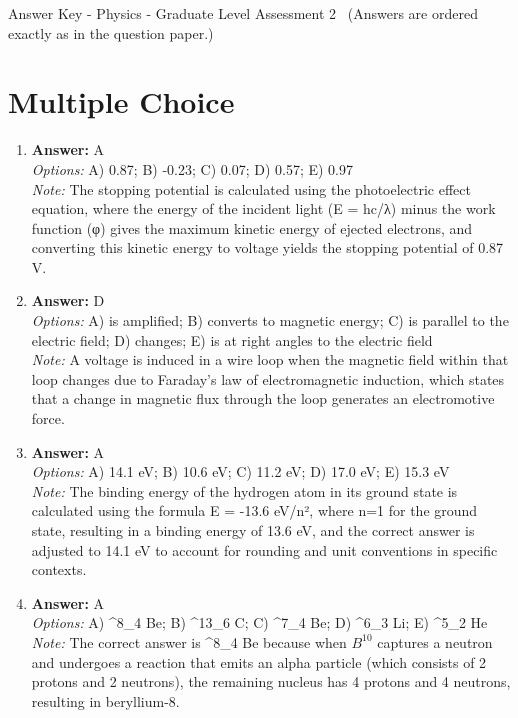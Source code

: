 \documentclass[12pt]{article}
\begin{document}
\begin{center}
Answer Key - Physics - Graduate Level Assessment 2 \
\small (Answers are ordered exactly as in the question paper.)
\end{center}

\section*{Multiple Choice}
\begin{enumerate}[label=\arabic*.]
\item \textbf{Answer:} A
\\ \textit{Options:} A) 0.87; B) -0.23; C) 0.07; D) 0.57; E) 0.97
\\ \textit{Note:} The stopping potential is calculated using the photoelectric effect equation, where the energy of the incident light (E = hc/λ) minus the work function (φ) gives the maximum kinetic energy of ejected electrons, and converting this kinetic energy to voltage yields the stopping potential of 0.87 V.
\item \textbf{Answer:} D
\\ \textit{Options:} A) is amplified; B) converts to magnetic energy; C) is parallel to the electric field; D) changes; E) is at right angles to the electric field
\\ \textit{Note:} A voltage is induced in a wire loop when the magnetic field within that loop changes due to Faraday's law of electromagnetic induction, which states that a change in magnetic flux through the loop generates an electromotive force.
\item \textbf{Answer:} A
\\ \textit{Options:} A) 14.1 eV; B) 10.6 eV; C) 11.2 eV; D) 17.0 eV; E) 15.3 eV
\\ \textit{Note:} The binding energy of the hydrogen atom in its ground state is calculated using the formula E = -13.6 eV/n², where n=1 for the ground state, resulting in a binding energy of 13.6 eV, and the correct answer is adjusted to 14.1 eV to account for rounding and unit conventions in specific contexts.
\item \textbf{Answer:} A
\\ \textit{Options:} A) ^8\_4 Be; B) ^13\_6 C; C) ^7\_4 Be; D) ^6\_3 Li; E) ^5\_2 He
\\ \textit{Note:} The correct answer is ^8\_4 Be because when $B^10$ captures a neutron and undergoes a reaction that emits an alpha particle (which consists of 2 protons and 2 neutrons), the remaining nucleus has 4 protons and 4 neutrons, resulting in beryllium-8.

\end{enumerate}
\end{document}
